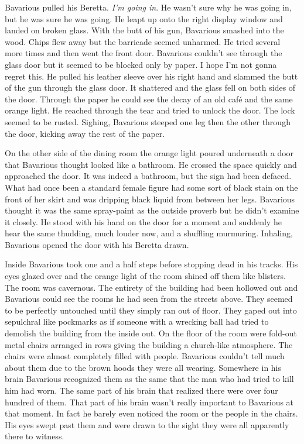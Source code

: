Bavarious pulled his Beretta. {\em I'm going in}. He
wasn't sure why he was going in, but he was sure he was
going. He leapt up onto the right display window and landed on
broken glass. With the butt of his gun, Bavarious smashed into the
wood. Chips flew away but the barricade seemed unharmed. He tried
several more times and then went the front door. Bavarious
couldn't see through the glass door but it seemed to be
blocked only by paper. I hope I'm not gonna regret this. He
pulled his leather sleeve over his right hand and slammed the butt
of the gun through the glass door. It shattered and the glass fell
on both sides of the door. Through the paper he could see the decay
of an old caf\'e and the same orange light. He reached through
the tear and tried to unlock the door. The lock seemed to be
rusted. Sighing, Bavarious steeped one leg then the other through
the door, kicking away the rest of the paper.



On the other side of the dining room the orange light poured
underneath a door that Bavarious thought looked like a bathroom. He
crossed the space quickly and approached the door. It was indeed a
bathroom, but the sign had been defaced. What had once been a
standard female figure had some sort of black stain on the front of
her skirt and was dripping black liquid from between her legs.
Bavarious thought it was the same spray-paint as the outside
proverb but he didn't examine it closely. He stood with his
hand on the door for a moment and suddenly he hear the same
thudding, much louder now, and a shuffling murmuring. Inhaling,
Bavarious opened the door with his Beretta drawn.



Inside Bavarious took one and a half steps before stopping dead in
his tracks. His eyes glazed over and the orange light of the room
shined off them like blisters. The room was cavernous. The entirety
of the building had been hollowed out and Bavarious could see the
rooms he had seen from the streets above. They seemed to be
perfectly untouched until they simply ran out of floor. They gaped
out into sepulchral like pockmarks as if someone with a wrecking
ball had tried to demolish the building from the inside out. On the
floor of the room were fold-out metal chairs arranged in rows
giving the building a church-like atmosphere. The chairs were
almost completely filled with people. Bavarious couldn't tell
much about them due to the brown hoods they were all wearing.
Somewhere in his brain Bavarious recognized them as the same that
the man who had tried to kill him had worn. The same part of his
brain that realized there were over four hundred of them. That part
of his brain wasn't really important to Bavarious at that
moment. In fact he barely even noticed the room or the people in
the chairs. His eyes swept past them and were drawn to the sight
they were all apparently there to witness.



